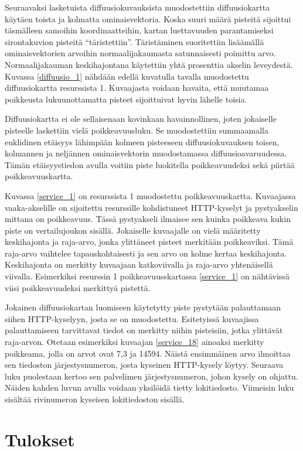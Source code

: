 Seuraavaksi lasketuista diffuusiokuvauksista muodostettiin
diffuusiokartta käytäen toista ja kolmatta ominaisvektoria. Koska
suuri määrä pisteitä sijoittui täsmälleen samoihin koordinaatteihin,
kartan luettavuuden parantamiseksi sirontakuvion pisteitä
``täristettiin''. Täristäminen suoritettiin lisäämällä
ominaisvektorien arvoihin normaalijakaumasta satunnaisesti poimittu
arvo. Normaalijakauman keskihajontana käytettiin yhtä prosenttia
akselin leveydestä. Kuvassa \ref{diffuusio_1} nähdään edellä kuvatulla
tavalla muodostettu diffuusiokartta resurssista 1. Kuvaajasta voidaan
havaita, että muutamaa poikkeusta lukuunottamatta pisteet sijoittuivat
hyvin lähelle toisia.

Diffuusiokartta ei ole sellaisenaan kovinkaan havainnollinen, joten
jokaiselle pisteelle laskettiin vielä poikkeavuusluku. Se muodostettiin
summaamalla euklidinen etäisyys lähimpään kolmeen pisteeseen
diffuusiokuvauksen toisen, kolmannen ja neljännen ominaisvektorin
muodostamassa diffuusioavaruudessa. Tämän etäisyystiedon avulla voitiin piste
luokitella poikkeavuudeksi sekä piirtää poikkeavuuskartta.

Kuvassa \ref{service_1} on resurssista 1 muodostettu poikkeavuuskartta. Kuvaajassa vaaka-akselille on sijoitettu resurssille kohdistuneet HTTP-kyselyt
ja pystyakselin mittana on poikkeavuus. Tässä pystyakseli ilmaisee sen kuinka poikkeava kukin piste on vertailujoukon sisällä. Jokaiselle kuvaajalle
on vielä määritetty keskihajonta ja raja-arvo, jonka ylittäneet pisteet merkitään poikkeaviksi. Tämä raja-arvo vaihtelee tapauskohtaisesti ja sen
arvo on kolme kertaa keskihajonta. Keskihajonta on merkitty kuvaajaan katkoviivalla ja raja-arvo yhtenäisellä viivalla. Esimerkiksi resurssin 1 
poikkeavuusskartassa \ref{service_1} on nähtävissä viisi poikkeavuudeksi merkittyä pistettä.

Jokainen diffuusiokartan luomiseen käytetytty piste pystytään
palauttamaan siihen HTTP-kyselyyn, josta se on
muodostettu. Esitetyissä kuvaajissa palauttamiseen tarvittavat tiedot
on merkitty niihin pisteisiin, jotka ylittävät raja-arvon. Otetaan
esimerkiksi kuvaajan \ref{service_18} ainoaksi merkitty poikkeama,
jolla on arvot ovat 7,3 ja 14594. Näistä ensimmäinen arvo ilmoittaa
sen tiedoston järjestysnumeron, josta kyseinen HTTP-kysely
löytyy. Seuraava luku puolestaan kertoo sen palvelimen
järjestysnumeron, johon kysely on ohjattu. Näiden kahden luvun avulla
voidaan yksilöidä tietty lokitiedosto. Viimeisin luku sisältää
rivinumeron kyseisen lokitiedoston sisällä.

\section{Tulokset}

